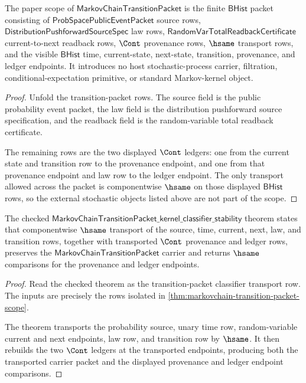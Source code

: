 \begin{theorem}
\label{thm:markovchain-transition-packet-scope}
The paper scope of $\mathsf{MarkovChainTransitionPacket}$ is the finite
$\mathsf{BHist}$ packet consisting of
$\mathsf{ProbSpacePublicEventPacket}$ source rows,
$\mathsf{DistributionPushforwardSourceSpec}$ law rows,
$\mathsf{RandomVarTotalReadbackCertificate}$ current-to-next readback rows,
$\Cont$ provenance rows, $\hsame$ transport rows, and the visible
$\mathsf{BHist}$ time, current-state, next-state, transition, provenance, and
ledger endpoints. It introduces no host stochastic-process carrier, filtration,
conditional-expectation primitive, or standard Markov-kernel object.
\end{theorem}
\begin{proof}
Unfold the transition-packet rows. The source field is the public probability
event packet, the law field is the distribution pushforward source
specification, and the readback field is the random-variable total readback
certificate.

The remaining rows are the two displayed $\Cont$ ledgers: one from the current
state and transition row to the provenance endpoint, and one from that
provenance endpoint and law row to the ledger endpoint. The only transport
allowed across the packet is componentwise $\hsame$ on those displayed
$\mathsf{BHist}$ rows, so the external stochastic objects listed above are not
part of the scope.
\end{proof}

\begin{theorem}
\label{thm:markovchain-lean-target-surface}
The checked
$\mathsf{MarkovChainTransitionPacket\_kernel\_classifier\_stability}$ theorem
states that componentwise $\hsame$ transport of the source, time, current,
next, law, and transition rows, together with transported $\Cont$ provenance
and ledger rows, preserves the $\mathsf{MarkovChainTransitionPacket}$ carrier
and returns $\hsame$ comparisons for the provenance and ledger endpoints.
\end{theorem}
\begin{proof}
Read the checked theorem as the transition-packet classifier transport row.
The inputs are precisely the rows isolated in
\autoref{thm:markovchain-transition-packet-scope}.

The theorem transports the probability source, unary time row,
random-variable current and next endpoints, law row, and transition row by
$\hsame$. It then rebuilds the two $\Cont$ ledgers at the transported
endpoints, producing both the transported carrier packet and the displayed
provenance and ledger endpoint comparisons.
\end{proof}

